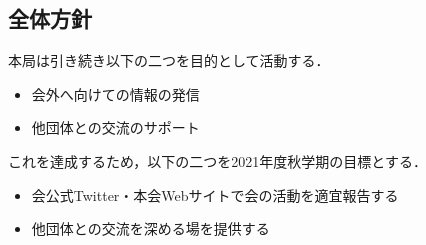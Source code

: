 \subsection*{全体方針}


本局は引き続き以下の二つを目的として活動する．
\begin{itemize}
    \item 会外へ向けての情報の発信
    \item 他団体との交流のサポート
\end{itemize}
これを達成するため，以下の二つを2021年度秋学期の目標とする．
\begin{itemize}
    \item 会公式Twitter・本会Webサイトで会の活動を適宜報告する
    \item 他団体との交流を深める場を提供する
\end{itemize}